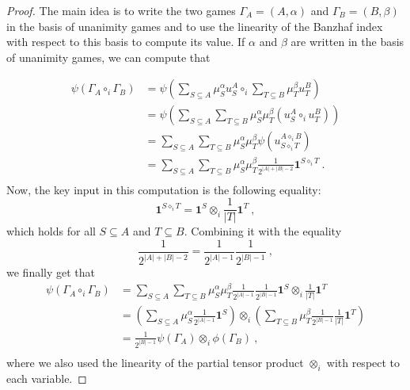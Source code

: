 \documentclass[a4paper,12pt]{amsart}
\begin{document}
\begin{proof}
The main idea is to write the two games \(\Gamma_A = (A, \alpha)\) and \(\Gamma_B = (B, \beta)\) in the basis of unanimity games and to use the linearity of the Banzhaf index with respect to this basis to compute its value. If $\alpha$ and $\beta$ are written in the basis of unanimity games, we can compute that

    \[ \begin{aligned} 
    \psi( \Gamma_A \circ_i \Gamma_B) & = \psi \left( \sum_{S \subseteq A} \mu^\alpha_S u^A_S \circ_i \sum_{T \subseteq B} \mu^\beta_T u^B_T \right) \\
    & = \psi \left( \sum_{S \subseteq A} \sum_{T \subseteq B} \mu^\alpha_S \mu^\beta_T \left( u^A_S \circ_i u^B_T \right) \right) \\
    & = \sum_{S \subseteq A} \sum_{T \subseteq B} \mu^\alpha_S \mu^\beta_T \psi \left( u^{A \diamond_i B}_{S \diamond_i T} \right) \\
    & = \sum_{S \subseteq A} \sum_{T \subseteq B} \mu^\alpha_S \mu^\beta_T \frac{1}{2^{\lvert A \rvert + \lvert B \rvert - 2}} \mathbf{1}^{S \diamond_i T}~.  \\
    \end{aligned} \]
Now, the key input in this computation is the following equality:
\[
\mathbf{1}^{S \diamond_i T} = \mathbf{1}^S \otimes_i \frac{1}{\lvert T \rvert} \mathbf{1}^T~,
\]
which holds for all $S \subseteq A$ and $T \subseteq B$. Combining it with the equality 
\[
\frac{1}{2^{\lvert A \rvert + \lvert B \rvert - 2}} = \frac{1}{2^{\lvert A \rvert - 1}} \frac{1}{2^{\lvert B \rvert - 1}}~,
\]
we finally get that 
    \[ \begin{aligned} 
    \psi(\Gamma_A \circ_i \Gamma_B) & = \sum_{S \subseteq A} \sum_{T \subseteq B} \mu^\alpha_S \mu^\beta_T \frac{1}{2^{\lvert A \rvert - 1}} \frac{1}{2^{\lvert B \rvert - 1}} \mathbf{1}^S \otimes_i \frac{1}{\lvert T \rvert} \mathbf{1}^T \\
    & = \left( \sum_{S \subseteq A} \mu^\alpha_S \frac{1}{2^{\lvert A \rvert - 1}} \mathbf{1}^S \right) \otimes_i \left( \sum_{T \subseteq B} \mu^\beta_T \frac{1}{2^{\lvert B \rvert - 1}} \frac{1}{\lvert T \rvert} \mathbf{1}^T \right) \\
    & = \frac{1}{2^{\lvert B \rvert - 1}}\psi(\Gamma_A) \otimes_i \phi(\Gamma_B)~, \\
    \end{aligned}
    \]
where we also used the linearity of the partial tensor product $\otimes_i$ with respect to each variable. 
\end{proof}



\end{document}
